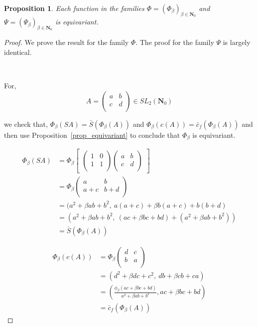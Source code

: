 \documentclass{article}
\newtheorem{proposition}[theorem]{Proposition}  %
\begin{document}
\begin{proposition}
Each function in the families $\Phi = (\Phi_\beta)_{\beta \in \mathbf{N}_0}$ and $\Psi = (\Psi_\beta)_{\beta \in \mathbf{N}_0}$ is equivariant.
\end{proposition}

\begin{proof}
We prove the result for the family $\Phi$. The proof for the family $\Psi$ is largely identical.

\

For,
$$A = \begin{pmatrix}
a & b \\
c & d \\
\end{pmatrix} \in SL_2(\mathbf{N}_0)$$

we check that, $\Phi_\beta(SA) = \bar{S}(\Phi_\beta(A))$ and $\Phi_\beta\left(c(A)\right) = \bar{c}_f(\Phi_\beta(A))$ and then use Proposition~\ref{prop_equivariant} to conclude that $\Phi_\beta$ is equivariant.

\begin{align*}
\Phi_\beta(SA) &=  \Phi_\beta \begin{bmatrix} \begin{pmatrix}
1 & 0 \\
1 & 1 \\
\end{pmatrix} 
\begin{pmatrix}
a & b \\
c & d \\
\end{pmatrix} 
\end{bmatrix} \\
               &=\Phi_\beta \begin{pmatrix}
                            a & b \\
                            a+c & b+d \\
                            \end{pmatrix} \\
               &= (a^2 + \beta ab + b^2, \ a(a+c) + \beta b(a+c) + b(b+d)\\
               &= (a^2 + \beta ab + b^2, \ (ac + \beta bc + bd) + (a^2 + \beta ab + b^2)) \\
               &= \bar{S}(\Phi_\beta(A))
\end{align*}

\begin{align*}
\Phi_\beta(c(A)) &= \Phi_\beta\begin{pmatrix}
    d & c \\
    b & a \\
\end{pmatrix} \\
        &= (d^2 + \beta dc + c^2, \ db + \beta cb + ca) \\
        &= (\frac{\phi_\beta(ac + \beta bc + bd)}{a^2 + \beta ab + b^2}, ac + \beta bc + bd) \\
        &=\bar{c}_f(\Phi_\beta(A))
\end{align*}
\end{proof}
\end{document}
